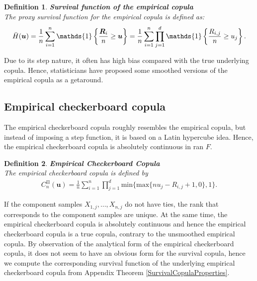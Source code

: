 \documentclass[12pt]{report}
\newtheorem{definition}{Definition}[subsection]
\newcommand{\1}{\mathbf{1}}
\begin{document}
\begin{flushleft}
\begin{definition}\label{SurvECDef}
\textbf{Survival function of the empirical copula} \\
The proxy survival function for the empirical copula is defined as:
\begin{align*}
\Bar{H}(\boldsymbol{u}) = \frac{1}{n} \sum\limits_{i = 1}^{n} \mathds{1}\left\{ \frac{\boldsymbol{R}_{i}}{n} \ge \boldsymbol{u} \right\} = \frac{1}{n} \sum\limits_{i = 1}^{n} \prod\limits_{j = 1}^{d} \mathds{1}\left\{ \frac{R_{i,j}}{n} \ge u_{j} \right\}.
\end{align*}
\end{definition}
Due to its step nature, it often has high bias compared with the true underlying copula. Hence, statisticians have proposed some smoothed versions of the empirical copula as a getaround.

\vspace{0.5cm}
\subsection{Empirical checkerboard copula}
\vspace{0.5cm}

The empirical checkerboard copula roughly resembles the empirical copula, but instead of imposing a step function, it is based on a Latin hypercube idea. Hence, the empirical checkerboard copula is absolutely continuous in ran $F$.

\begin{definition}\label{ECCDef}
\textbf{Empirical Checkerboard Copula} \\
The empirical checkerboard copula is defined by
\begin{align*}
C_{n}^{\boxplus}(\boldsymbol{u}) = \frac{1}{n} \sum\limits_{i = 1}^{n} \prod\limits_{j = 1}^{d} \mathrm{min} \{ \mathrm{max} \{ n u_{j} - R_{i,j} + 1, 0 \}, 1 \}.
\end{align*}
\end{definition}

If the component samples $X_{1,j}, \dots, X_{n,j}$ do not have ties, the rank that corresponds to the component samples are unique. At the same time, the empirical checkerboard copula is absolutely continuous and hence the empirical checkerboard copula is a true copula, contrary to the unsmoothed empirical copula. By observation of the analytical form of the empirical checkerboard copula, it does not seem to have an obvious form for the survival copula, hence we compute the corresponding survival function of the underlying empirical checkerboard copula from Appendix Theorem \ref{SurvivalCopulaProperties}.


\end{flushleft}
\end{document}
